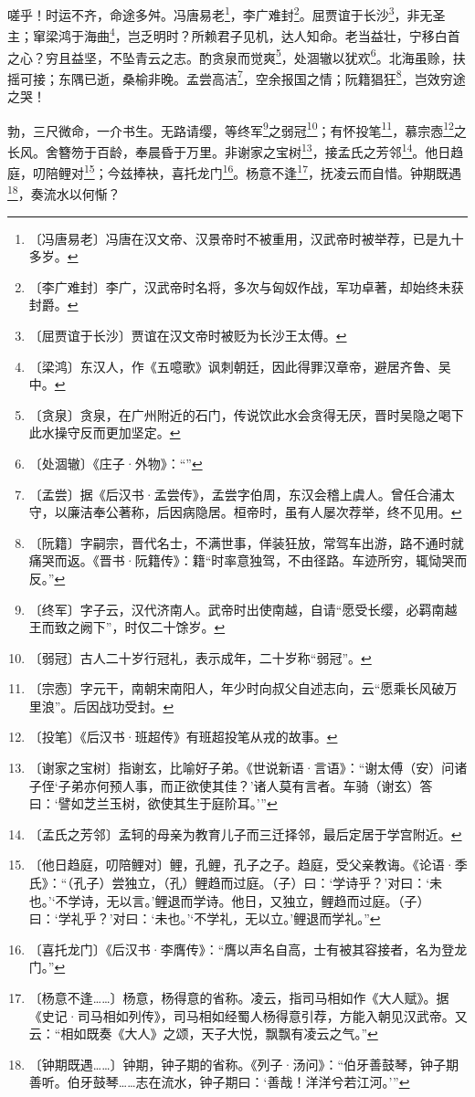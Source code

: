 \documentclass[12pt,UTF-8,openany]{ctexbook}
\begin{document}
\begin{normalsize}
    嗟乎！时运不齐，命途多舛。冯唐易老\footnote{〔冯唐易老〕冯唐在汉文帝、汉景帝时不被重用，汉武帝时被举荐，已是九十多岁。}，李广难封\footnote{〔李广难封〕李广，汉武帝时名将，多次与匈奴作战，军功卓著，却始终未获封爵。}。屈贾谊于长沙\footnote{〔屈贾谊于长沙〕贾谊在汉文帝时被贬为长沙王太傅。}，非无圣主；窜梁鸿于海曲\footnote{〔梁鸿〕东汉人，作《五噫歌》讽刺朝廷，因此得罪汉章帝，避居齐鲁、吴中。}，岂乏明时？所赖君子见机，达人知命。老当益壮，宁移白首之心？穷且益坚，不坠青云之志。酌贪泉而觉爽\footnote{〔贪泉〕贪泉，在广州附近的石门，传说饮此水会贪得无厌，晋时吴隐之喝下此水操守反而更加坚定。}，处涸辙以犹欢\footnote{〔处涸辙〕《庄子·外物》：“”}。北海虽赊，扶摇可接；东隅已逝，桑榆非晚。孟尝高洁\footnote{〔孟尝〕据《后汉书·孟尝传》，孟尝字伯周，东汉会稽上虞人。曾任合浦太守，以廉洁奉公著称，后因病隐居。桓帝时，虽有人屡次荐举，终不见用。}，空余报国之情；阮籍猖狂\footnote{〔阮籍〕字嗣宗，晋代名士，不满世事，佯装狂放，常驾车出游，路不通时就痛哭而返。《晋书·阮籍传》：籍“时率意独驾，不由径路。车迹所穷，辄恸哭而反。”}，岂效穷途之哭！
    
    勃，三尺微命，一介书生。无路请缨，等终军\footnote{〔终军〕字子云，汉代济南人。武帝时出使南越，自请“愿受长缨，必羁南越王而致之阙下”，时仅二十馀岁。}之弱冠\footnote{〔弱冠〕古人二十岁行冠礼，表示成年，二十岁称“弱冠”。}；有怀投笔\footnote{〔宗悫〕字元干，南朝宋南阳人，年少时向叔父自述志向，云“愿乘长风破万里浪”。后因战功受封。}，慕宗悫\footnote{〔投笔〕《后汉书·班超传》有班超投笔从戎的故事。}之长风。舍簪笏于百龄，奉晨昏于万里。非谢家之宝树\footnote{〔谢家之宝树〕指谢玄，比喻好子弟。《世说新语·言语》：“谢太傅（安）问诸子侄‘子弟亦何预人事，而正欲使其佳？’诸人莫有言者。车骑（谢玄）答曰：‘譬如芝兰玉树，欲使其生于庭阶耳。’”}，接孟氏之芳邻\footnote{〔孟氏之芳邻〕孟轲的母亲为教育儿子而三迁择邻，最后定居于学宫附近。}。他日趋庭，叨陪鲤对\footnote{〔他日趋庭，叨陪鲤对〕鲤，孔鲤，孔子之子。趋庭，受父亲教诲。《论语·季氏》：“（孔子）尝独立，（孔）鲤趋而过庭。（子）曰：‘学诗乎？’对曰：‘未也。’‘不学诗，无以言。’鲤退而学诗。他日，又独立，鲤趋而过庭。（子）曰：‘学礼乎？’对曰：‘未也。’‘不学礼，无以立。’鲤退而学礼。”}；今兹捧袂，喜托龙门\footnote{〔喜托龙门〕《后汉书·李膺传》：“膺以声名自高，士有被其容接者，名为登龙门。”}。杨意不逢\footnote{〔杨意不逢……〕杨意，杨得意的省称。凌云，指司马相如作《大人赋》。据《史记·司马相如列传》，司马相如经蜀人杨得意引荐，方能入朝见汉武帝。又云：“相如既奏《大人》之颂，天子大悦，飘飘有凌云之气。”}，抚凌云而自惜。钟期既遇\footnote{〔钟期既遇……〕钟期，钟子期的省称。《列子·汤问》：“伯牙善鼓琴，钟子期善听。伯牙鼓琴……志在流水，钟子期曰：‘善哉！洋洋兮若江河。’”}，奏流水以何惭？
    

\end{normalsize}
\end{document}
